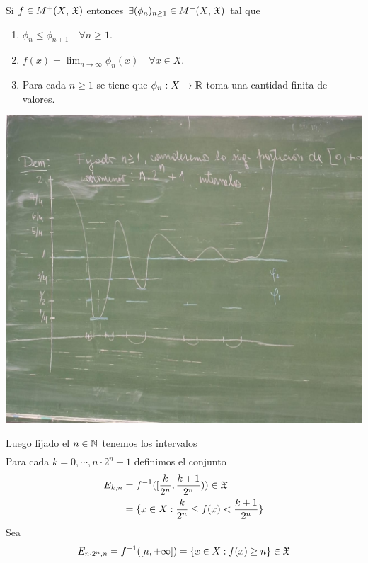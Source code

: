 Si $f \in M^+(X \text{, } \mathfrak{X})$ entonces $\exists (\phi_n)_{n \geq 1} \in M^+(X \text{, } \mathfrak{X})$ tal que \begin{enumerate}
    \item $\phi_n \leq \phi_{n+1} \quad \forall n \geq 1$.
    \item $f(x) = \lim_{n \to \infty} \phi_n(x) \quad \forall x \in X$.
    \item Para cada $n \geq 1$ se tiene que $\phi_n : X \to \mathbb{R}$ toma una cantidad finita de valores.
\end{enumerate}
\begin{center}
    \includegraphics[width=1\textwidth]{Images/clase4.jpeg}
\end{center}
Luego fijado el $n \in \mathbb{N}$ tenemos los intervalos \begin{align*}
    [0, \frac{1}{2}), [\frac{1}{2^n}, \frac{2}{2^n}), \cdots, [\frac{2^{n-1}}{2^n}, \frac{2^n}{2^n}),
    [\frac{2^n}{2^n}, \frac{2^n+1}{2^n}), \cdots, [\frac{n \cdot 2^n - 1}{2^n}, \frac{n \cdot 2^n}{2^n}), [n, +\infty]
\end{align*}
Para cada $k = 0, \cdots, n \cdot 2^n - 1$ definimos el conjunto
\begin{align*}
    E_{k, n} & = f^{-1}([\frac{k}{2^n}, \frac{k+1}{2^n})) \in \mathfrak{X}       \\
             & = \{ x \in X : \frac{k}{2^n} \leq f(x) < \frac{k+1}{2^n} \}
\end{align*}
Sea \begin{align*}
    E_{n \cdot 2^n, n} = f^{-1}([n, +\infty]) = \{ x \in X : f(x) \geq n \} \in \mathfrak{X}
\end{align*}

